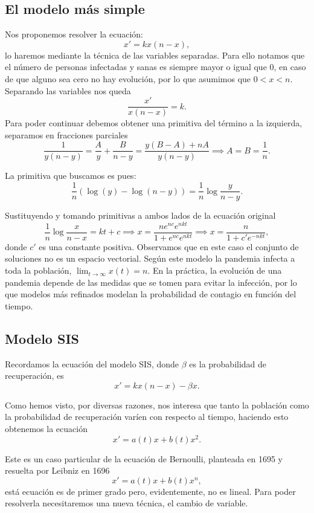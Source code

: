 \documentclass[../main.tex]{subfiles}
\begin{document}
\subsection{El modelo más simple}

Nos proponemos resolver la ecuación:
\[x' = k x(n - x),\]
lo haremos mediante la técnica de las variables separadas. Para ello notamos que
el número de personas infectadas y sanas es siempre mayor o igual que 0, en caso
de que alguno sea cero no hay evolución, por lo que asumimos que \(0 < x < n\).
Separando las variables nos queda
\[\frac{x'}{x(n - x)} = k.\]
Para poder continuar debemos obtener una primitiva del término a la izquierda,
separamos en fracciones parciales
\[\frac{1}{y(n - y)} = \frac{A}{y} + \frac{B}{n - y}
	= \frac{y(B - A) + nA}{y(n - y)} \implies A = B = \frac{1}{n}.\]

La primitiva que buscamos es pues:
\[\frac{1}{n} (\log(y) - \log(n - y)) = \frac{1}{n} \log \frac{y}{n - y}.\]

Sustituyendo y tomando primitivas a ambos lados de la ecuación original
\[\frac{1}{n} \log\frac{x}{n - x} = kt + c
	\implies x = \frac{n e^{nc} e^{nkt}}{1 + e^{nc} e^{nkt}}
	\implies x = \frac{n}{1 + c' e^{-nkt}},\]
donde \(c'\) es una constante positiva. Observamos que en este caso el
conjunto de soluciones no es un espacio vectorial. Según este modelo la
pandemia infecta a toda la población, \(\lim_{t \to \infty} x(t) = n\). En la
práctica, la evolución de una pandemia depende de las medidas que se tomen
para evitar la infección, por lo que modelos más refinados modelan la
probabilidad de contagio en función del tiempo.

\subsection{Modelo SIS}

Recordamos la ecuación del modelo SIS, donde \(\beta\) es la probabilidad de
recuperación, es
\[x' = k x(n - x) - \beta x.\]

Como hemos visto, por diversas razones, nos interesa que tanto la población como
la probabilidad de recuperación varíen con respecto al tiempo, haciendo esto
obtenemos la ecuación
\[x' = a(t)x + b(t)x^2.\]

Este es un caso particular de la ecuación de Bernoulli, planteada en 1695 y
resuelta por Leibniz en 1696
\[x' = a(t)x + b(t)x^n,\]
está ecuación es de primer grado pero, evidentemente, no es lineal. Para poder
resolverla necesitaremos una nueva técnica, el cambio de variable.
\end{document}

